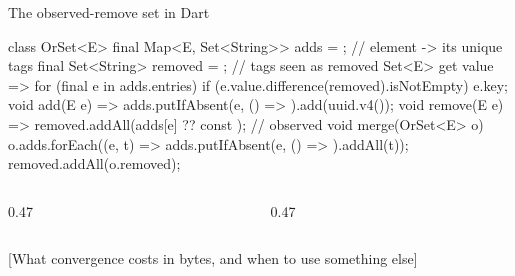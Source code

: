 \documentclass[10pt,aspectratio=169,t]{beamer}
\begin{document}
\begin{frame}[fragile,eyebrow=CRDTs]{The observed-remove set in Dart}
\begin{dart}
class OrSet<E> {
  final Map<E, Set<String>> adds = {};   // element -> its unique tags
  final Set<String> removed = {};        // tags seen as removed
  Set<E> get value => {for (final e in adds.entries)
      if (e.value.difference(removed).isNotEmpty) e.key};
  void add(E e) => adds.putIfAbsent(e, () => {}).add(uuid.v4());
  void remove(E e) => removed.addAll(adds[e] ?? const {});  // observed
  void merge(OrSet<E> o) {
    o.adds.forEach((e, t) => adds.putIfAbsent(e, () => {}).addAll(t));
    removed.addAll(o.removed);}
}
\end{dart}
  \begin{columns}[T]
    \begin{column}{0.47\textwidth}
    \end{column}
    \begin{column}{0.47\textwidth}
    \end{column}
  \end{columns}
\end{frame}

[What convergence costs in bytes, and when to use something else]
\end{document}
